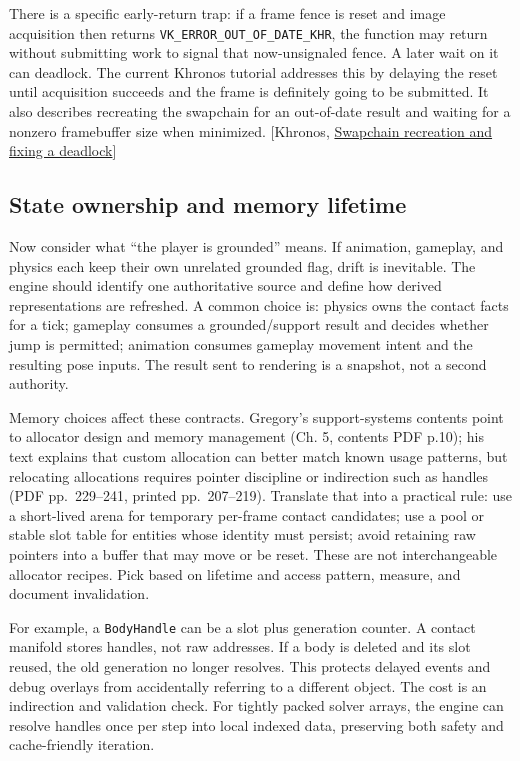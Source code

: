 There is a specific early-return trap: if a frame fence is reset and image acquisition then returns \texttt{VK\_ERROR\_OUT\_OF\_DATE\_KHR}, the function may return without submitting work to signal that now-unsignaled fence. A later wait on it can deadlock. The current Khronos tutorial addresses this by delaying the reset until acquisition succeeds and the frame is definitely going to be submitted. It also describes recreating the swapchain for an out-of-date result and waiting for a nonzero framebuffer size when minimized. {[}Khronos, \href{https://docs.vulkan.org/tutorial/latest/03_Drawing_a_triangle/04_Swap_chain_recreation.html}{Swapchain recreation and fixing a deadlock}{]}

\subsection{State ownership and memory lifetime}\label{05-engine-i-ch014-state-ownership-and-memory-lifetime}

\hypertarget{05-engine-i-ch014-state-ownership-and-memory-lifetime}{}

Now consider what ``the player is grounded'' means. If animation, gameplay, and physics each keep their own unrelated grounded flag, drift is inevitable. The engine should identify one authoritative source and define how derived representations are refreshed. A common choice is: physics owns the contact facts for a tick; gameplay consumes a grounded/support result and decides whether jump is permitted; animation consumes gameplay movement intent and the resulting pose inputs. The result sent to rendering is a snapshot, not a second authority.

Memory choices affect these contracts. Gregory's support-systems contents point to allocator design and memory management (Ch. 5, contents PDF p.10); his text explains that custom allocation can better match known usage patterns, but relocating allocations requires pointer discipline or indirection such as handles (PDF pp.~229--241, printed pp.~207--219). Translate that into a practical rule: use a short-lived arena for temporary per-frame contact candidates; use a pool or stable slot table for entities whose identity must persist; avoid retaining raw pointers into a buffer that may move or be reset. These are not interchangeable allocator recipes. Pick based on lifetime and access pattern, measure, and document invalidation.

For example, a \texttt{BodyHandle} can be a slot plus generation counter. A contact manifold stores handles, not raw addresses. If a body is deleted and its slot reused, the old generation no longer resolves. This protects delayed events and debug overlays from accidentally referring to a different object. The cost is an indirection and validation check. For tightly packed solver arrays, the engine can resolve handles once per step into local indexed data, preserving both safety and cache-friendly iteration.

